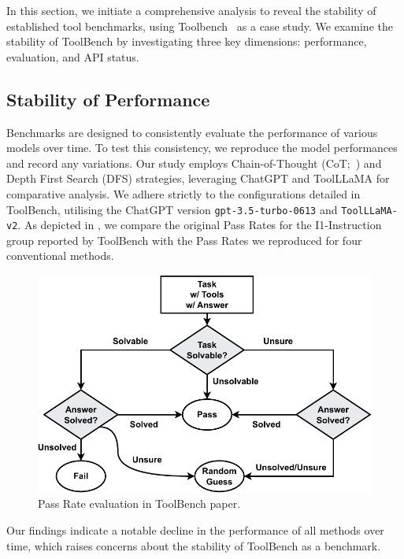 In this section, we initiate a comprehensive analysis to reveal the stability of established tool benchmarks, using Toolbench~\citep{qin2023tool} as a case study.
We examine the stability of ToolBench by investigating three key dimensions: performance, evaluation, and API status.

\subsection{Stability of Performance}\label{sec:pre_analysis_performance}

Benchmarks are designed to consistently evaluate the performance of various models over time.
To test this consistency, we reproduce the model performances and record any variations.
Our study employs Chain-of-Thought (CoT;~\citealp{wei2023chainofthought}) and Depth First Search (DFS) strategies, leveraging ChatGPT and ToolLLaMA for comparative analysis.
We adhere strictly to the configurations detailed in ToolBench, utilising the ChatGPT version \texttt{gpt-3.5-turbo-0613} and \texttt{ToolLLaMA-v2}.
As depicted in , we compare the original Pass Rates for the I1-Instruction group reported by ToolBench with the Pass Rates we reproduced for four conventional methods.
\begin{figure}[]
    \centering
    \includegraphics[width=\linewidth]{figs/PR.pdf}
    \caption{Pass Rate evaluation in ToolBench paper.}
    \label{fig:pass-rate}
\end{figure}
Our findings indicate a notable decline in the performance of all methods over time, which raises concerns about the stability of ToolBench as a benchmark.



